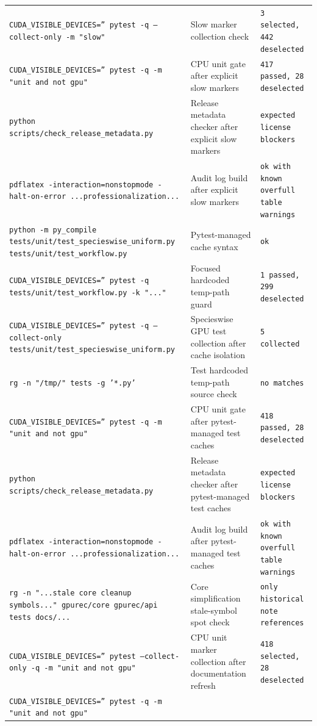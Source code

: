 \documentclass[11pt]{article}
\begin{document}
\begin{center}
\begin{tabular}{lll}
\texttt{CUDA\_VISIBLE\_DEVICES='' pytest -q --collect-only -m "slow"} &
Slow marker collection check &
\texttt{3 selected, 442 deselected} \\
\texttt{CUDA\_VISIBLE\_DEVICES='' pytest -q -m "unit and not gpu"} &
CPU unit gate after explicit slow markers &
\texttt{417 passed, 28 deselected} \\
\texttt{python scripts/check\_release\_metadata.py} &
Release metadata checker after explicit slow markers &
\texttt{expected license blockers} \\
\texttt{pdflatex -interaction=nonstopmode -halt-on-error ...professionalization...} &
Audit log build after explicit slow markers &
\texttt{ok with known overfull table warnings} \\
\texttt{python -m py\_compile tests/unit/test\_specieswise\_uniform.py tests/unit/test\_workflow.py} &
Pytest-managed cache syntax &
\texttt{ok} \\
\texttt{CUDA\_VISIBLE\_DEVICES='' pytest -q tests/unit/test\_workflow.py -k "..."} &
Focused hardcoded temp-path guard &
\texttt{1 passed, 299 deselected} \\
\texttt{CUDA\_VISIBLE\_DEVICES='' pytest -q --collect-only tests/unit/test\_specieswise\_uniform.py} &
Specieswise GPU test collection after cache isolation &
\texttt{5 collected} \\
\texttt{rg -n "/tmp/" tests -g '*.py'} &
Test hardcoded temp-path source check &
\texttt{no matches} \\
\texttt{CUDA\_VISIBLE\_DEVICES='' pytest -q -m "unit and not gpu"} &
CPU unit gate after pytest-managed test caches &
\texttt{418 passed, 28 deselected} \\
\texttt{python scripts/check\_release\_metadata.py} &
Release metadata checker after pytest-managed test caches &
\texttt{expected license blockers} \\
\texttt{pdflatex -interaction=nonstopmode -halt-on-error ...professionalization...} &
Audit log build after pytest-managed test caches &
\texttt{ok with known overfull table warnings} \\
\texttt{rg -n "...stale core cleanup symbols..." gpurec/core gpurec/api tests docs/...} &
Core simplification stale-symbol spot check &
\texttt{only historical note references} \\
\texttt{CUDA\_VISIBLE\_DEVICES='' pytest --collect-only -q -m "unit and not gpu"} &
CPU unit marker collection after documentation refresh &
\texttt{418 selected, 28 deselected} \\
\texttt{CUDA\_VISIBLE\_DEVICES='' pytest -q -m "unit and not gpu"} &

\end{tabular}
\end{center}
\end{document}
